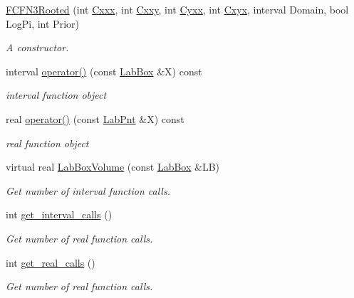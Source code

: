 \begin{DoxyCompactItemize}
\item 
\hyperlink{classFCFN3Rooted_ab2f9c0dacc708812e3493dfddbd6d0e9}{\-F\-C\-F\-N3\-Rooted} (int \hyperlink{classFCFN3Rooted_aa8d0899c02617f891b449bf4fea77124}{\-Cxxx}, int \hyperlink{classFCFN3Rooted_a0e5c7aed5b6d0a32f31f6256d667bb94}{\-Cxxy}, int \hyperlink{classFCFN3Rooted_aafa3f819584022c0bdae373df692dbef}{\-Cyxx}, int \hyperlink{classFCFN3Rooted_afa52426ba2915fa90e85fd870a99936b}{\-Cxyx}, interval \-Domain, bool \-Log\-Pi, int \-Prior)
\begin{DoxyCompactList}\small\item\em \-A constructor. \end{DoxyCompactList}\item 
interval \hyperlink{classFCFN3Rooted_a13851aabf5dfdd262bd5d0c3b0128612}{operator()} (const \hyperlink{classLabBox}{\-Lab\-Box} \&\-X) const 
\begin{DoxyCompactList}\small\item\em interval function object \end{DoxyCompactList}\item 
real \hyperlink{classFCFN3Rooted_aeae1016b0962cf66922fdf27c0fdb514}{operator()} (const \hyperlink{classLabPnt}{\-Lab\-Pnt} \&\-X) const 
\begin{DoxyCompactList}\small\item\em real function object \end{DoxyCompactList}\item 
virtual real \hyperlink{classFCFN3Rooted_a0797569e9fea66f72f4e90642e10da15}{\-Lab\-Box\-Volume} (const \hyperlink{classLabBox}{\-Lab\-Box} \&\-L\-B)
\begin{DoxyCompactList}\small\item\em \-Get number of interval function calls. \end{DoxyCompactList}\item 
int \hyperlink{classFCFN3Rooted_ac1b0ba1a574c970bd1681f4273d4075e}{get\-\_\-interval\-\_\-calls} ()
\begin{DoxyCompactList}\small\item\em \-Get number of real function calls. \end{DoxyCompactList}\item 
int \hyperlink{classFCFN3Rooted_acd3454ab1e5e8b52f323749a5236856e}{get\-\_\-real\-\_\-calls} ()
\begin{DoxyCompactList}\small\item\em \-Get number of real function calls. \end{DoxyCompactList}\end{DoxyCompactItemize}
